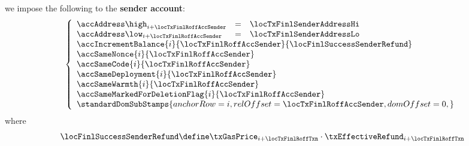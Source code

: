 we impose the following to the \textbf{sender account}:
\[
	\left\{\begin{array}{lcl}
		\accAddress\high _{i + \locTxFinlRoffAccSender} & = & \locTxFinlSenderAddressHi \\
		\accAddress\low  _{i + \locTxFinlRoffAccSender} & = & \locTxFinlSenderAddressLo \\
		\multicolumn{3}{l}{\accIncrementBalance {i}{\locTxFinlRoffAccSender}{\locFinlSuccessSenderRefund}} \\
		\multicolumn{3}{l}{\accSameNonce                      {i}{\locTxFinlRoffAccSender}} \\
		\multicolumn{3}{l}{\accSameCode                       {i}{\locTxFinlRoffAccSender}} \\
		\multicolumn{3}{l}{\accSameDeployment                 {i}{\locTxFinlRoffAccSender}} \\
		\multicolumn{3}{l}{\accSameWarmth                     {i}{\locTxFinlRoffAccSender}} \\
		\multicolumn{3}{l}{\accSameMarkedForDeletionFlag      {i}{\locTxFinlRoffAccSender}} \\
		\multicolumn{3}{l}{
			\standardDomSubStamps {
				anchorRow   = i                       ,
				relOffset   = \locTxFinlRoffAccSender ,
				domOffset   = 0                       ,
			}
		} \\
	\end{array}\right.
\]
where
\[
	\locFinlSuccessSenderRefund \define
	\txGasPrice_{i + \locTxFinlRoffTxn}
	\cdot \txEffectiveRefund_{i + \locTxFinlRoffTxn}
\]
